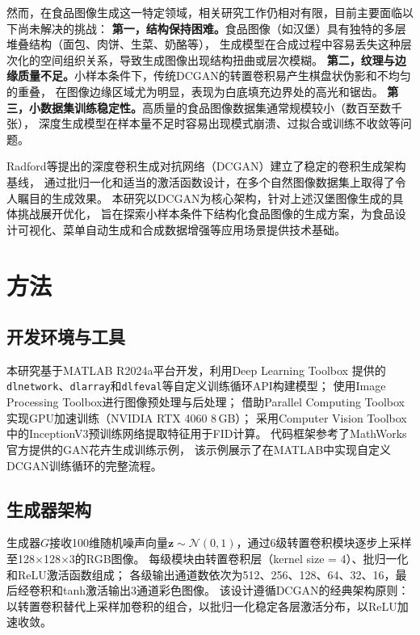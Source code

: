 \documentclass[12pt,a4paper]{ctexart}  %
\begin{document}
然而，在食品图像生成这一特定领域，相关研究工作仍相对有限，目前主要面临以下尚未解决的挑战：
\textbf{第一，结构保持困难。}食品图像（如汉堡）具有独特的多层堆叠结构（面包、肉饼、生菜、奶酪等），
生成模型在合成过程中容易丢失这种层次化的空间组织关系，导致生成图像出现结构扭曲或层次模糊。
\textbf{第二，纹理与边缘质量不足。}小样本条件下，传统DCGAN的转置卷积易产生棋盘状伪影和不均匀的重叠，
在图像边缘区域尤为明显，表现为白底填充边界处的高光和锯齿。
\textbf{第三，小数据集训练稳定性。}高质量的食品图像数据集通常规模较小（数百至数千张），
深度生成模型在样本量不足时容易出现模式崩溃、过拟合或训练不收敛等问题。

Radford等\cite{radford2016dcgan}提出的深度卷积生成对抗网络（DCGAN）建立了稳定的卷积生成架构基线，
通过批归一化和适当的激活函数设计，在多个自然图像数据集上取得了令人瞩目的生成效果。
本研究以DCGAN为核心架构，针对上述汉堡图像生成的具体挑战展开优化，
旨在探索小样本条件下结构化食品图像的生成方案，为食品设计可视化、菜单自动生成和合成数据增强等应用场景提供技术基础。

\section{方法}

\subsection{开发环境与工具}

本研究基于MATLAB R2024a平台开发\cite{matlab2024}，利用Deep Learning Toolbox
提供的\texttt{dlnetwork}、\texttt{dlarray}和\texttt{dlfeval}等自定义训练循环API构建模型；
使用Image Processing Toolbox进行图像预处理与后处理；
借助Parallel Computing Toolbox实现GPU加速训练（NVIDIA RTX 4060 8\,GB）；
采用Computer Vision Toolbox中的InceptionV3预训练网络提取特征用于FID计算。
代码框架参考了MathWorks官方提供的GAN花卉生成训练示例\cite{mathworksGAN}，
该示例展示了在MATLAB中实现自定义DCGAN训练循环的完整流程。

\subsection{生成器架构}

生成器$G$接收100维随机噪声向量$\mathbf{z} \sim \mathcal{N}(0, 1)$，通过6级转置卷积模块逐步上采样至128×128×3的RGB图像。
每级模块由转置卷积层（kernel size = 4）、批归一化和ReLU激活函数组成；
各级输出通道数依次为512、256、128、64、32、16，最后经卷积和tanh激活输出3通道彩色图像。
该设计遵循DCGAN的经典架构原则\cite{radford2016dcgan}：以转置卷积替代上采样加卷积的组合，以批归一化稳定各层激活分布，以ReLU加速收敛。
\end{document}
